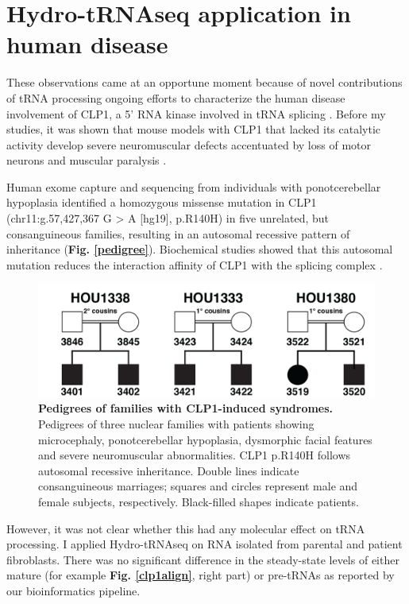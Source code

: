 \documentclass[12pt]{rockefeller}
\begin{document}
\section{Hydro-tRNAseq application in human disease}\label{clp1section}
These observations came at an opportune moment because of novel contributions of tRNA processing ongoing efforts to characterize the human disease involvement of \gls{CLP1}, a 5' RNA kinase involved in tRNA splicing \cite{Weitzer:2007hda}. Before my studies, it was shown that mouse models with CLP1 that lacked its catalytic activity develop severe neuromuscular defects accentuated by loss of motor neurons and muscular paralysis \cite{Hanada:2013bk}. 

Human exome capture and sequencing from individuals with ponotcerebellar hypoplasia identified a homozygous missense mutation in CLP1 (chr11:g.57,427,367 G > A [hg19], p.R140H) in five unrelated, but consanguineous families, resulting in an autosomal recessive pattern of inheritance (\textbf{Fig. \ref{pedigree}}). Biochemical studies showed that this autosomal mutation reduces the interaction affinity of CLP1 with the splicing complex \cite{Karaca:2014em}. 

\begin{figure}[!ht]%
\centering
\includegraphics[width=\textwidth]{pedigree1.png}%
\caption[Pedigrees of families with CLP1-induced syndromes.]
{\textbf{Pedigrees of families with CLP1-induced syndromes.}
Pedigrees of three nuclear families with patients showing microcephaly, ponotcerebellar hypoplasia, dysmorphic facial features and severe neuromuscular abnormalities. CLP1 p.R140H follows autosomal recessive inheritance. Double lines indicate consanguineous marriages; squares and circles represent male and female subjects, respectively. Black-filled shapes indicate patients.}
\label{introntrna}
\end{figure}

However, it was not clear whether this had any molecular effect on tRNA processing. I applied Hydro-tRNAseq on RNA isolated from parental and patient fibroblasts. There was no significant difference in the steady-state levels of either mature (for example \textbf{Fig. \ref{clp1align}}, right part) or pre-tRNAs as reported by our bioinformatics pipeline. 
\end{document}
